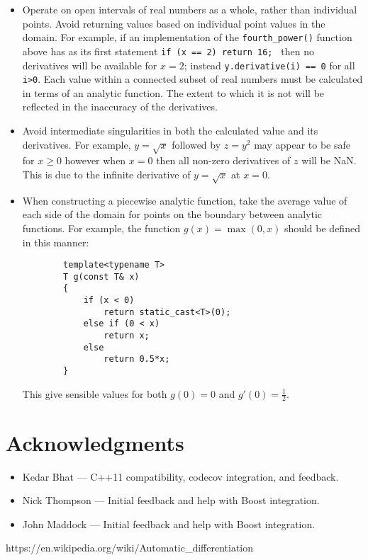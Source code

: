 \documentclass{article}
\begin{document}
\begin{itemize}
\item Operate on open intervals of real numbers as a whole, rather than individual points.  Avoid
returning values based on individual point values in the domain.  For example, if an implementation of the
{\tt fourth\_power()} function above has as its first statement {\tt if (x == 2) return 16; } then no
derivatives will be available for $x=2$; instead {\tt y.derivative(i) == 0} for all {\tt i>0}. Each value within a
connected subset of real numbers must be calculated in terms of an analytic function. The extent to which it is not
will be reflected in the inaccuracy of the derivatives.
\item Avoid intermediate singularities in both the calculated value and its derivatives. For example, $y=\sqrt{x}$
followed by $z=y^2$ may appear to be safe for $x\ge0$ however when $x=0$ then all non-zero derivatives of $z$ will
be NaN. This is due to the infinite derivative of $y=\sqrt{x}$ at $x=0$.
\item When constructing a piecewise analytic function, take the average value of each side of the domain for points
on the boundary between analytic functions. For example, the function $g(x) = \max(0,x)$ should be
defined in this manner:
    \begin{verbatim}
        template<typename T>
        T g(const T& x)
        {
            if (x < 0)
                return static_cast<T>(0);
            else if (0 < x)
                return x;
            else
                return 0.5*x;
        }
    \end{verbatim}
This give sensible values for both $g(0)=0$ and $g'(0)=\frac{1}{2}$.
\end{itemize}

\section{Acknowledgments}

\begin{itemize}
\item Kedar Bhat --- C++11 compatibility, codecov integration, and feedback.
\item Nick Thompson --- Initial feedback and help with Boost integration.
\item John Maddock --- Initial feedback and help with Boost integration.
\end{itemize}

\begin{thebibliography}{1}
 https://en.wikipedia.org/wiki/Automatic\_differentiation
\end{thebibliography}
\end{document}
